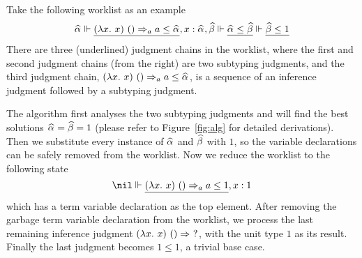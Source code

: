 Take the following worklist as an example
$$\al \Vdash \underline{(\lam x)~() \To_a a \le \al} , x:\al, \bt \Vdash \underline{\al \le \bt} \Vdash \underline{\bt \le 1}$$
There are three (underlined) judgment chains in the worklist,
where the first and second judgment chains (from the right) are two subtyping judgments,
and the third judgment chain, $(\lam x)~() \To_a a \le \al$,
is a sequence of an inference judgment followed by a subtyping judgment.

The algorithm first analyses the two subtyping judgments and
will find the best solutions $\al = \bt = 1$
(please refer to Figure~\ref{fig:alg} for detailed derivations).
Then we substitute every instance of $\al$ and $\bt$ with $1$,
so the variable declarations can be safely removed from the worklist.
Now we reduce the worklist to the following state
$$\nil \Vdash \underline{(\lam x)~() \To_a a \le 1}, x:1$$
which has a term variable declaration as the top element.
After removing the garbage term variable declaration from the worklist, we process the last remaining
inference judgment $(\lam x)~()\To~?$, with the unit type $1$ as its result.
Finally the last judgment becomes $1 \le 1$, a trivial base case.





